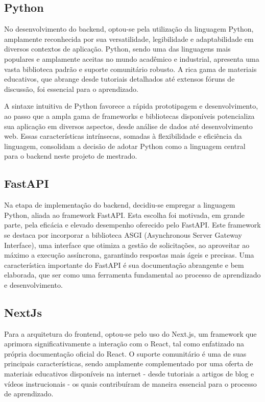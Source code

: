 \subsection{Python}
No desenvolvimento do backend, optou-se pela utilização da linguagem Python, amplamente reconhecida por sua versatilidade, legibilidade e adaptabilidade em diversos contextos de aplicação. Python, sendo uma das linguagens mais populares e amplamente aceitas no mundo acadêmico e industrial, apresenta uma vasta biblioteca padrão e suporte comunitário robusto. A rica gama de materiais educativos, que abrange desde tutoriais detalhados até extensos fóruns de discussão, foi essencial para o aprendizado.

A sintaxe intuitiva de Python favorece a rápida prototipagem e desenvolvimento, ao passo que a ampla gama de frameworks e bibliotecas disponíveis potencializa sua aplicação em diversos aspectos, desde análise de dados até desenvolvimento web. Essas características intrínsecas, somadas à flexibilidade e eficiência da linguagem, consolidam a decisão de adotar Python como a linguagem central para o backend neste projeto de mestrado.


\subsection{FastAPI}
Na etapa de implementação do backend, decidiu-se empregar a linguagem Python, aliada ao framework FastAPI. Esta escolha foi motivada, em grande parte, pela eficácia e elevado desempenho oferecido pelo FastAPI. Este framework se destaca por incorporar a biblioteca ASGI (Asynchronous Server Gateway Interface), uma interface que otimiza a gestão de solicitações, ao aproveitar ao máximo a execução assíncrona, garantindo respostas mais ágeis e precisas. Uma característica importante do FastAPI é sua documentação abrangente e bem elaborada, que ser como uma ferramenta fundamental ao processo de aprendizado e desenvolvimento.

\subsection{NextJs}
Para a arquitetura do frontend, optou-se pelo uso do Next.js, um framework que aprimora significativamente a interação com o React, tal como enfatizado na própria documentação oficial do React. O suporte comunitário é uma de suas principais características, sendo amplamente complementado por uma oferta de materiais educativos disponíveis na internet - desde tutoriais a artigos de blog e vídeos instrucionais - os quais contribuíram de maneira essencial para o processo de aprendizado.

